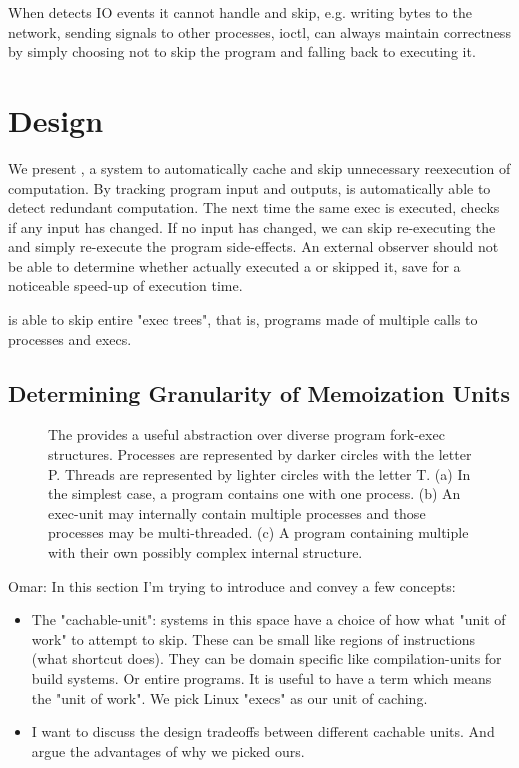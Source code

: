 When \pc detects IO events it cannot handle and skip, e.g. writing bytes to the network, sending signals
to other processes, ioctl, \pc can always maintain correctness by simply choosing not to skip the
program and falling back to executing it.

\section{\pc Design}
We present \pc, a system to automatically cache and skip unnecessary reexecution of computation. By tracking program input and outputs, \pc is automatically able to detect redundant computation. The next time the same exec is executed, \pc checks if any input has changed. If no input has changed, we can skip re-executing the \cacheunit{} and simply re-execute the program side-effects. An external observer should not be able to determine whether \pc actually executed a \cacheunit{} or skipped it, save for a noticeable speed-up of execution time.

\pc is able to skip entire "exec trees", that is, programs made of multiple calls to processes and execs.
\subsection{Determining Granularity of Memoization Units}

\begin{figure*}
\centering
{}
\caption{The \cacheunit{} provides a useful abstraction over diverse program fork-exec structures. Processes are represented by darker circles with the letter P. Threads are represented by lighter
circles with the letter T. (a) In the simplest case, a program contains one \cacheunit{} with one process. (b) An exec-unit may internally contain multiple processes and those processes may be multi-threaded. (c) A program containing multiple \cacheunit{} with their own possibly complex internal
structure.}
\label{fig:exec-units}
\end{figure*}

Omar: In this section I'm trying to introduce and convey a few concepts:
\begin{itemize}
  \item The "cachable-unit": systems in this space have a choice of how what "unit of work" to attempt to skip. These can be small like regions of instructions (what shortcut does). They can be domain specific like compilation-units for build systems. Or entire programs. It is useful to have a term which means the "unit of work". We pick Linux "execs" as our unit of caching.
  \item I want to discuss the design tradeoffs between different cachable units. And argue the advantages of why we picked ours.
  \end{itemize}

